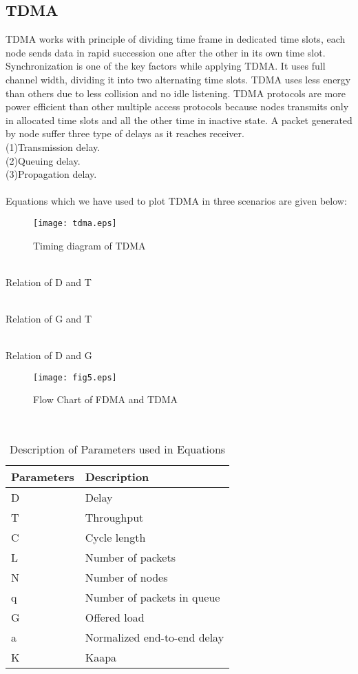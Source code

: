 \documentclass[11pt, conference, compsocconf, onecolumn]{IEEEtran}
\begin{document}
\subsection{TDMA}
TDMA works with principle of dividing time frame in dedicated time slots, each node sends data in rapid
succession one after the other in its own time slot. Synchronization is one of the key factors while applying TDMA. It uses full channel width, dividing it
into two alternating time slots. TDMA uses less energy than others due to less collision and no idle listening. TDMA protocols are more power efficient than other multiple access protocols because nodes transmits only in allocated time slots and all the other time in inactive state. A packet generated by node suffer three type of delays as it reaches receiver.
\\
{(1)}Transmission delay.
\\
{(2)}Queuing delay.
\\
{(3)}Propagation delay.
\\
\\
Equations which we have used to plot TDMA in three scenarios are given below:
\begin{figure}[!h]
\centering
\caption{Timing diagram of TDMA}
\texttt{[image: tdma.eps]}
\end{figure}
\\
Relation of D and T

\\
Relation of G and T

\\
Relation of D and G

\begin{figure}[!h]
\centering
\caption{Flow Chart of FDMA and TDMA}
\texttt{[image: fig5.eps]}
\end{figure}
\\
\begin{table}
\caption{Description of Parameters used in Equations}
\begin{center}
    \begin{tabular}{ | p{2.5cm} | p{2.5cm} |}
    \hline
    Parameters & Description\\ \hline
    D & Delay\\ \hline
    T & Throughput\\ \hline
    C & Cycle length\\ \hline
    L & Number of packets\\ \hline
    N & Number of nodes\\ \hline
    q & Number of packets in queue\\ \hline
    G & Offered load\\ \hline
    a & Normalized end-to-end delay\\ \hline
    K & Kaapa\\ \hline
    \end{tabular}
\end{center}
\end{table}
\end{document}
